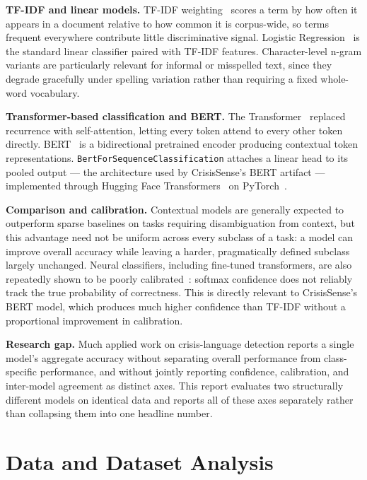 \documentclass[12pt,a4paper]{article}
\begin{document}
\textbf{TF-IDF and linear models.} TF-IDF weighting~\cite{sparckjones1972statistical} scores a term by how often it appears in a document relative to how common it is corpus-wide, so terms frequent everywhere contribute little discriminative signal. Logistic Regression~\cite{cox1958regression} is the standard linear classifier paired with TF-IDF features. Character-level n-gram variants are particularly relevant for informal or misspelled text, since they degrade gracefully under spelling variation rather than requiring a fixed whole-word vocabulary.

\textbf{Transformer-based classification and BERT.} The Transformer~\cite{vaswani2017attention} replaced recurrence with self-attention, letting every token attend to every other token directly. BERT~\cite{devlin2019bert} is a bidirectional pretrained encoder producing contextual token representations. \texttt{BertForSequenceClassification} attaches a linear head to its pooled output --- the architecture used by CrisisSense's BERT artifact --- implemented through Hugging Face Transformers~\cite{wolf2020transformers} on PyTorch~\cite{paszke2019pytorch}.

\textbf{Comparison and calibration.} Contextual models are generally expected to outperform sparse baselines on tasks requiring disambiguation from context, but this advantage need not be uniform across every subclass of a task: a model can improve overall accuracy while leaving a harder, pragmatically defined subclass largely unchanged. Neural classifiers, including fine-tuned transformers, are also repeatedly shown to be poorly calibrated~\cite{guo2017calibration,naeini2015obtaining}: softmax confidence does not reliably track the true probability of correctness. This is directly relevant to CrisisSense's BERT model, which produces much higher confidence than TF-IDF without a proportional improvement in calibration.

\textbf{Research gap.} Much applied work on crisis-language detection reports a single model's aggregate accuracy without separating overall performance from class-specific performance, and without jointly reporting confidence, calibration, and inter-model agreement as distinct axes. This report evaluates two structurally different models on identical data and reports all of these axes separately rather than collapsing them into one headline number.

\section{Data and Dataset Analysis}
\end{document}
